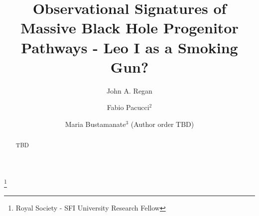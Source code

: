 \documentclass[twocolumn, tighten]{aastex631}
\begin{document}
\title[Leo I a fossil galaxy]{Observational Signatures of Massive Black Hole Progenitor Pathways - Leo I as a Smoking Gun?}

\author[0000-0001-9072-6427]{John A. Regan}
\thanks{Royal Society - SFI University Research Fellow}

\author{Fabio Pacucci$^{2}$}
\author{Maria Bustamanate$^{3}$ (Author order TBD)}





\begin{abstract}
 TBD
\end{abstract}

\end{document}
